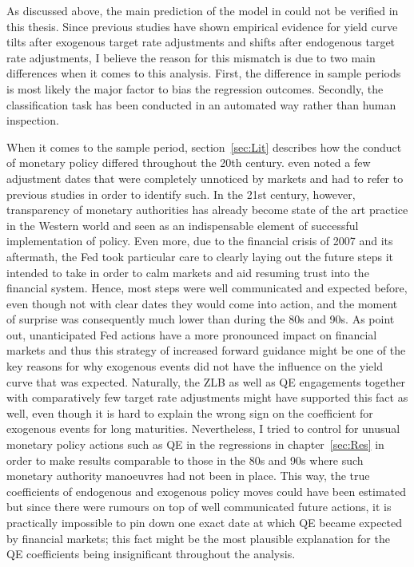 
As discussed above, the main prediction of the model in \textcite{Ellingsen.2001} could not be verified in this thesis. Since previous studies have shown empirical evidence for yield curve tilts after exogenous target rate adjustments and shifts after endogenous target rate adjustments, I believe the reason for this mismatch is due to two main differences when it comes to this analysis. First, the difference in sample periods is most likely the major factor to bias the regression outcomes. Secondly, the classification task has been conducted in an automated way rather than human inspection.

When it comes to the sample period, section~\ref{sec:Lit} describes how the conduct of monetary policy differed throughout the 20th century. \textcite{Ellingsen.2003} even noted a few adjustment dates that were completely unnoticed by markets and had to refer to previous studies in order to identify such. In the 21st century, however, transparency of monetary authorities has already become state of the art practice in the Western world and seen as an indispensable element of successful implementation of policy. Even more, due to the financial crisis of 2007 and its aftermath, the Fed took particular care to clearly laying out the future steps it intended to take in order to calm markets and aid resuming trust into the financial system. Hence, most steps were well communicated and expected before, even though not with clear dates they would come into action, and the moment of surprise was consequently much lower than during the 80s and 90s. As \textcite{Ellingsen.2003} point out, unanticipated Fed actions have a more pronounced impact on financial markets and thus this strategy of increased forward guidance might be one of the key reasons for why exogenous events did not have the influence on the yield curve that was expected. Naturally, the ZLB as well as QE engagements together with comparatively few target rate adjustments might have supported this fact as well, even though it is hard to explain the wrong sign on the coefficient for exogenous events for long maturities. Nevertheless, I tried to control for unusual monetary policy actions such as QE in the regressions in chapter~\ref{sec:Res} in order to make results comparable to those in the 80s and 90s where such monetary authority manoeuvres had not been in place. This way, the true coefficients of endogenous and exogenous policy moves could have been estimated but since there were rumours on top of well communicated future actions, it is practically impossible to pin down one exact date at which QE became expected by financial markets; this fact might be the most plausible explanation for the QE coefficients being insignificant throughout the analysis.


